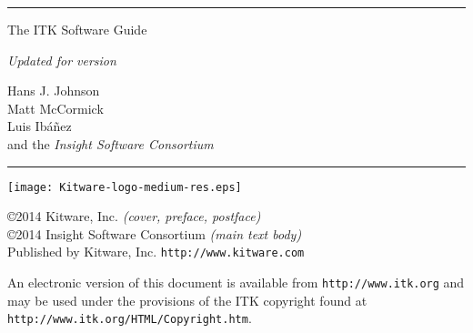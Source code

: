 \begin{minipage}[t][3cm][b]{\textwidth}
\rule{14cm}{1pt}
\end{minipage}


\begin{minipage}[t][3cm][b]{\textwidth}
\Huge
The ITK Software Guide\\
\normalsize
\par
\emph{Updated for version \ITKVERSIONMAJORMINOR}\\
\end{minipage}

\hfill
\begin{minipage}[t][6cm][b]{0.6\textwidth}
\Large
\renewcommand{\baselinestretch}{1.5}
Hans J. Johnson\\
Matt McCormick \\
Luis Ib\'{a}\~{n}ez\\
and the \emph{Insight Software Consortium}
\normalsize
\end{minipage}


\begin{minipage}[t][2cm][b]{\textwidth}
\rule{14cm}{1pt}
\end{minipage}

\newpage

\begin{minipage}[t][4cm][b]{\textwidth}
\begin{center}
\texttt{[image: Kitware-logo-medium-res.eps]}
\end{center}
\par
\begin{center}
\large

\copyright 2014 Kitware, Inc. \emph{(cover, preface, postface)}\\
\copyright 2014 Insight Software Consortium \emph{(main text body)}\\
Published by Kitware, Inc. \texttt{http://www.kitware.com}
\normalsize
\end{center}
\end{minipage}


\begin{minipage}[t][2.25cm][b]{\textwidth}
\begin{center}
An electronic version of this document is available from
\texttt{http://www.itk.org} and may be used under the provisions of the
ITK copyright found at \texttt{http://www.itk.org/HTML/Copyright.htm}.
\end{center}
\end{minipage}


